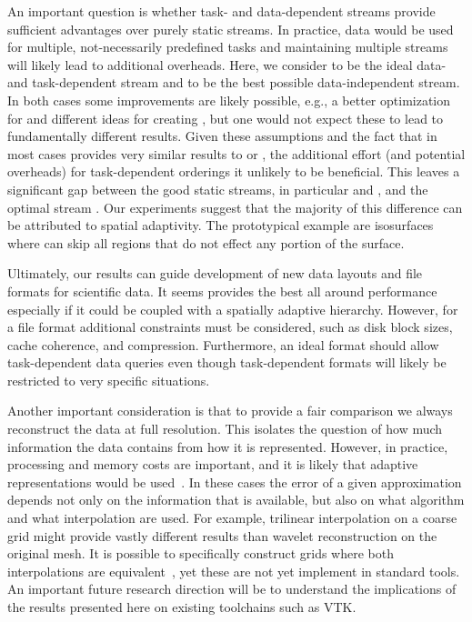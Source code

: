 An important question is whether task- and data-dependent streams provide sufficient advantages over
purely static streams. In practice, data would be used for multiple, not-necessarily predefined tasks
and maintaining multiple streams will likely lead to additional overheads. Here, we consider \sopt
to be the ideal data- and task-dependent stream and \ssig to be the best possible data-independent
stream. In both cases some improvements are likely possible, e.g., a better optimization for \sopt
and different ideas for creating \ssig, but one would not expect these to lead to fundamentally
different results. Given these assumptions and the fact that \ssig in most cases provides very
similar results to \sbit or \swav, the additional effort (and potential overheads) for
task-dependent orderings it unlikely to be beneficial. This leaves a significant gap between the
good static streams, in particular \swav and \sbit, and the optimal stream \sopt. Our experiments
suggest that the majority of this difference can be attributed to spatial adaptivity. The
prototypical example are isosurfaces where \sopt can skip all regions that do not effect any
portion of the surface.

Ultimately, our results can guide development of new data layouts and file formats for scientific
data. It seems \swav provides the best all around performance especially if it could be coupled with
a spatially adaptive hierarchy. However, for a file format additional constraints must be
considered, such as disk block sizes, cache coherence, and compression. Furthermore, an ideal format
should allow task-dependent data queries even though task-dependent formats will likely be
restricted to very specific situations. 

Another important consideration is that to provide a fair comparison we always reconstruct the data
at full resolution. This isolates the question of how much information the data contains from how it
is represented. However, in practice, processing and memory costs are important, and it is likely
that adaptive representations would be used~\cite{gigavoxels,Gobbetti2008,vdb2013}. In these cases
the error of a given approximation depends not only on the information that is available, but also
on what algorithm and what interpolation are used. For example, trilinear interpolation on a coarse
grid might provide vastly different results than wavelet reconstruction on the original mesh. It is
possible to specifically construct grids where both interpolations are equivalent~\cite{weiss}, yet
these are not yet implement in standard tools. An important future research direction will be to
understand the implications of the results presented here on existing toolchains such as VTK.

